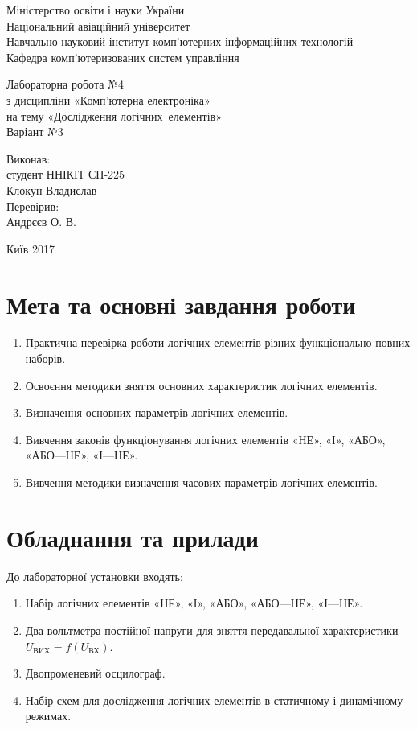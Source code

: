 \documentclass[a4paper,oneside,DIV=10,12pt]{scrartcl}
\begin{document}
	\begin{titlepage}
	\begin{center}
		Міністерство освіти і науки України\\
		Національний авіаційний університет\\
		Навчально-науковий інститут комп'ютерних інформаційних технологій\\
		Кафедра комп'ютеризованих систем управління

		\vspace{\fill}
		Лабораторна робота №4\\
		з дисципліни «Комп'ютерна електроніка»\\
		на тему «Дослідження логічних~елементів»\\
		Варіант №3
		
		\vspace{\fill}
		\begin{flushright}
		Виконав:\\
		студент ННІКІТ СП-225\\
		Клокун Владислав\\
		Перевірив:\\
		Андрєєв О. В.
		\end{flushright}
		
		Київ 2017
	\end{center}
	\end{titlepage}
	
	\section{Мета та основні завдання роботи}
		\begin{enumerate}
			\item Практична перевірка роботи логічних елементів різних функціонально-повних наборів.
			\item Освоєння методики зняття основних характеристик логічних елементів.
			\item Визначення основних параметрів логічних елементів.
			\item Вивчення законів функціонування логічних елементів «НЕ», «І», «АБО», «АБО—НЕ», «І—НЕ».
			\item Вивчення методики визначення часових параметрів логічних елементів.
		\end{enumerate}
	
	\section{Обладнання та прилади}
		До лабораторної установки входять:
		\begin{enumerate}
			\item Набір логічних елементів «НЕ», «І», «АБО», «АБО—НЕ», «І—НЕ».
			\item Два вольтметра постійної напруги для зняття передавальної характеристики $U_{\text{ВИХ}} = f \left(U_{\text{ВХ}}\right)$.
			\item Двопроменевий осцилограф.
			\item Набір схем для дослідження логічних елементів в статичному і динамічному режимах.
		\end{enumerate}
		
\end{document}

